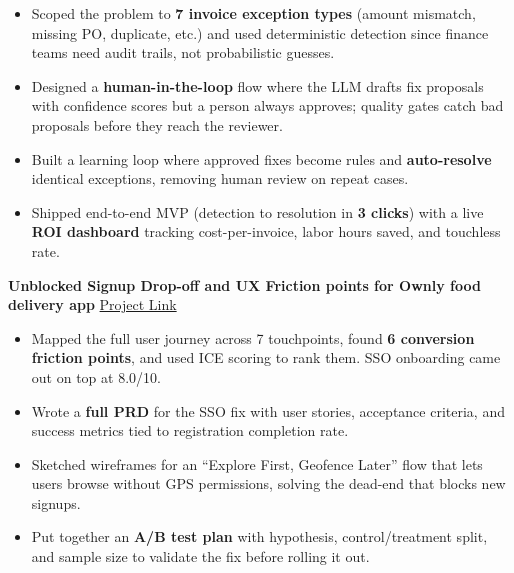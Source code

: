 \documentclass[a4paper,11pt]{article}
\begin{document}
\begin{itemize}[nosep,leftmargin=1em,itemsep=7pt]

\item Scoped the problem to \textbf{7 invoice exception types} (amount mismatch, missing PO, duplicate, etc.) and used deterministic detection since finance teams need audit trails, not probabilistic guesses.

\item Designed a \textbf{human-in-the-loop} flow where the LLM drafts fix proposals with confidence scores but a person always approves; quality gates catch bad proposals before they reach the reviewer.

\item Built a learning loop where approved fixes become rules and \textbf{auto-resolve} identical exceptions, removing human review on repeat cases.

\item Shipped end-to-end MVP (detection to resolution in \textbf{3 clicks}) with a live \textbf{ROI dashboard} tracking cost-per-invoice, labor hours saved, and touchless rate.

\end{itemize}


\textbf{Unblocked Signup Drop-off and UX Friction points for Ownly food delivery app}
\hfill
\href{https://drive.google.com/drive/folders/1f7JIWPRwlcHTbto9-NhSCaKxKleOFj6i}{Project Link}

\begin{itemize}[nosep,leftmargin=1em,itemsep=7pt]

\item Mapped the full user journey across 7 touchpoints, found \textbf{6 conversion friction points}, and used ICE scoring to rank them. SSO onboarding came out on top at 8.0/10.

\item Wrote a \textbf{full PRD} for the SSO fix with user stories, acceptance criteria, and success metrics tied to registration completion rate.

\item Sketched wireframes for an ``Explore First, Geofence Later'' flow that lets users browse without GPS permissions, solving the dead-end that blocks new signups.

\item Put together an \textbf{A/B test plan} with hypothesis, control/treatment split, and sample size to validate the fix before rolling it out.

\end{itemize}
\end{document}

